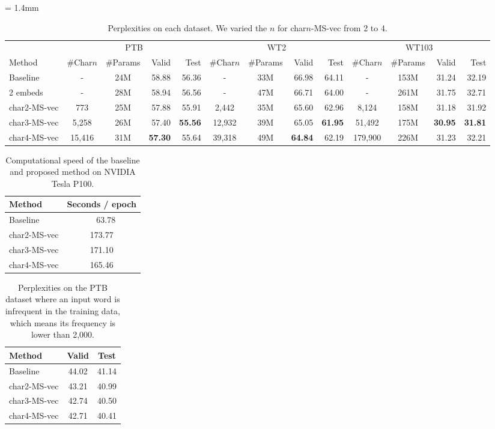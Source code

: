 \documentclass[letterpaper]{article} %
\begin{document}
\begin{table}[!t]
  \centering
  \tabcolsep = 1.4mm
  \begin{tabular}{ l | c c r  r | c c r r | c c r r }
  \toprule
   & \multicolumn{4}{c}{PTB} & \multicolumn{4}{|c}{WT2} & \multicolumn{4}{|c}{WT103} \\
  Method & \#Char$n$ & \#Params & Valid & Test & \#Char$n$ & \#Params & Valid & Test & \#Char$n$ & \#Params & Valid & Test \\
  \midrule
  Baseline & - & 24M & 58.88 & 56.36 & - & 33M & 66.98 & 64.11 & - & 153M & 31.24 & 32.19 \\
  2 embeds & - & 28M & 58.94 & 56.56 & - & 47M & 66.71 & 64.00 & - & 261M & 31.75 & 32.71 \\
  \midrule
  char2-MS-vec & 773 & 25M & 57.88 & 55.91 & 2,442 & 35M & 65.60 & 62.96 & 8,124 & 158M & 31.18 & 31.92 \\
  char3-MS-vec & 5,258 & 26M & 57.40 & {\bf 55.56} & 12,932 & 39M & 65.05 & {\bf 61.95} & 51,492 & 175M & {\bf 30.95} & {\bf 31.81} \\
  char4-MS-vec & 15,416 & 31M & {\bf 57.30} & 55.64 & 39,318 & 49M & {\bf 64.84} & 62.19 & 179,900 & 226M & 31.23 & 32.21 \\
  \bottomrule
  \end{tabular}
  \caption{Perplexities on each dataset. We varied the $n$ for char$n$-MS-vec from 2 to 4.\label{tab:perplexities4charn}}
\end{table}


\begin{table}[!t]
  \centering
  \begin{tabular}{ l | c  }
  \toprule
  Method & Seconds / epoch \\
  \midrule
  Baseline & \ \ 63.78 \\
  char2-MS-vec & 173.77 \\
  char3-MS-vec & 171.10 \\
  char4-MS-vec & 165.46 \\
  \bottomrule
  \end{tabular}
  \caption{Computational speed of the baseline and proposed method on NVIDIA Tesla P100.\label{tab:calc_speed}}
\end{table}


\begin{table}[!t]
  \centering
  \begin{tabular}{ l | c  c  }
  \toprule
  Method & Valid & Test \\
  \midrule
  Baseline & 44.02 & 41.14 \\
  \midrule
  char2-MS-vec & 43.21 & 40.99 \\
  char3-MS-vec & 42.74 & 40.50 \\
  char4-MS-vec & 42.71 & 40.41 \\
  \bottomrule
  \end{tabular}
  \caption{Perplexities on the PTB dataset where an input word is infrequent in the training data, which means its frequency is lower than 2,000.\label{tab:perplexities4freq}}
\end{table}
\end{document}
